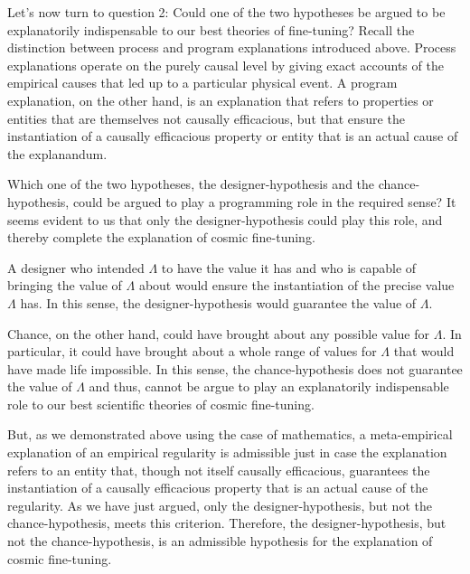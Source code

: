 \documentclass[a4paper,12pt]{article}
\begin{document}
Let's now turn to question 2: Could one of the two hypotheses be argued to be explanatorily indispensable to our best theories of fine-tuning? Recall the distinction between process and program explanations introduced above. Process explanations operate on the purely causal level by giving exact accounts of the empirical causes that led up to a particular physical event. A program explanation, on the other hand, is an explanation that refers to properties or entities that are themselves not causally efficacious, but that ensure the instantiation of a causally efficacious property or entity that is an actual cause of the explanandum.

Which one of the two hypotheses, the designer-hypothesis and the chance-hypothesis, could be argued to play a programming role in the required sense? It seems evident to us that only the designer-hypothesis could play this role, and thereby complete the explanation of cosmic fine-tuning.

A designer who intended $\Lambda$ to have the value it has and who is capable of bringing the value of $\Lambda$ about would ensure the instantiation of the precise value $\Lambda$ has. In this sense, the designer-hypothesis would guarantee the value of $\Lambda$. 

Chance, on the other hand, could have brought about any possible value for $\Lambda$. In particular, it could have brought about a whole range of values for $\Lambda$ that would have made life impossible. In this sense, the chance-hypothesis does not guarantee the value of $\Lambda$ and thus, cannot be argue to play an explanatorily indispensable role to our best scientific theories of cosmic fine-tuning.

But, as we demonstrated above using the case of mathematics, a meta-empirical explanation of an empirical regularity is admissible just in case the explanation refers to an entity that, though not itself causally efficacious, guarantees the instantiation of a causally efficacious property that is an actual cause of the regularity. As we have just argued, only the designer-hypothesis, but not the chance-hypothesis, meets this criterion. Therefore, the designer-hypothesis, but not the chance-hypothesis, is an admissible hypothesis for the explanation of cosmic fine-tuning.


\newpage

\footnotesize
\singlespacing
 
\end{document}
